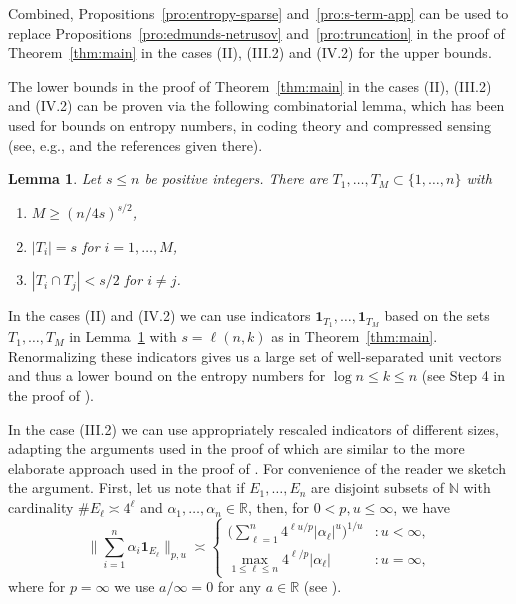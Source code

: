 \documentclass[a4paper,12pt]{article}
\newtheorem{lem}[thm]{Lemma}
\theoremstyle{definition}
\newcommand{\IN}{\mathbb{N}}
\newcommand{\IR}{\mathbb{R}}
\begin{document}
Combined, Propositions~\ref{pro:entropy-sparse} and~\ref{pro:s-term-app} can be used to replace Propositions~\ref{pro:edmunds-netrusov} and~\ref{pro:truncation} in the proof of Theorem~\ref{thm:main} in the cases (II), (III.2) and (IV.2) for the upper bounds.


The lower bounds in the proof of Theorem~\ref{thm:main} in the cases (II), (III.2) and (IV.2) can be proven via the following combinatorial lemma, which has been used for bounds on entropy numbers, in coding theory and compressed sensing (see, e.g., \cite[Lemma 9]{DV20} and the references given there). 

\begin{lem}\label{lem:combinatorial}
	Let $s\le n$ be positive integers. There are $T_1,\dots,T_M\subset \{1,\dots,n\}$ with
\begin{enumerate}[label=(\roman*)]
	\item $M\ge (n/4s)^{s/2}$,
	\item $|T_i|=s$ for $i=1,\dots,M$,
	\item $|T_i\cap T_j|<s/2$ for $i\neq j$.
\end{enumerate}
\end{lem}

In the cases (II) and (IV.2) we can use indicators $\mathbf{1}_{T_1},\dots,\mathbf{1}_{T_M}$ based on the sets $T_1,\dots,T_M$ in Lemma~\ref{lem:combinatorial} with $s=\ell(n,k)$ as in Theorem~\ref{thm:main}. Renormalizing these indicators gives us a large set of well-separated unit vectors and thus a lower bound on the entropy numbers for $\log n\le k\le n$ (see Step 4 in the proof of \cite[Theorem 2]{KV20}). 

In the case (III.2) we can use appropriately rescaled indicators of different sizes, adapting the arguments used in the proof of \cite[Theorem 10]{DV20} which are similar to the more elaborate approach used in the proof of \cite[Section 4, Theorem 2]{EN98}. For convenience of the reader we sketch the argument. First, let us note that if $E_1,\dots,E_n$ are disjoint subsets of $\IN$ with cardinality $\# E_\ell\asymp 4^{\ell}$ and $\alpha_1,\dots,\alpha_n\in\IR$, then, for $0<p,u\le \infty$, we have
\begin{equation} \label{eq:dyadic}
\Big\| \sum_{i=1}^{n}\alpha_i \mathbf{1}_{E_\ell}\Big\|_{p,u}
\asymp 
\begin{cases}
\Big(\sum_{\ell=1}^{n}4^{\ell u/p}|\alpha_\ell|^{u}\Big)^{1/u}&\colon u<\infty,\\
\max\limits_{1\le \ell\le n}4^{\ell/p}|\alpha_{\ell}|&\colon u=\infty,
\end{cases}
\end{equation}
where for $p=\infty$ we use $a/\infty=0$ for any $a\in\IR$ (see \cite[Lemma 6]{EN11}).
\end{document}
